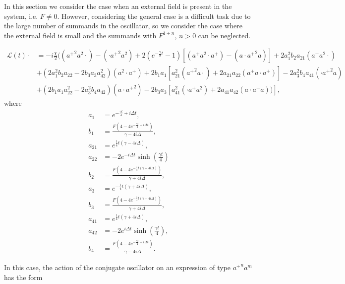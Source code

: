 \documentclass[12pt]{article}
\theoremstyle{definition}
\def\ga {\gamma}
\begin{document}
	In this section we consider the case when an external field is present in the system, i.e. $F \not= 0$. However, considering the general case is a difficult task due to the large number of summands in the oscillator, so we consider the case where the external field is small and the summands with $F^{1 + n}$, $n > 0$ can be neglected. 
	
	\begin{align}
		\label{eq:GenIntWithF}
		\mathcal{L}(t)\cdot &= -i\frac{\chi}{2}(({a^+}^2a^2\cdot) - (\cdot{a^+}^2a^2) + 2(e^{-\frac{\ga}{2}t} -1 ) [({a^+}a^2\cdot {a^+}) - (a\cdot{a^+}^2a) ] +2a_1^2b_2a_{21}({a^+}a^2\cdot) \nonumber\\
		&+ (2a_1^2b_2a_{22} - 2b_3a_3a_{42}^2)(a^2\cdot{a^+}) + 2b_1a_1 [a_{21}^2({a^+}^2a\cdot) + 2a_{21}a_{22}({a^+}a\cdot{a^+})] - 2a_3^2b_4a_{41}(\cdot{a^+}^2a) \\
		&+ (2b_1a_1a_{22}^2 - 2a_3^2b_4a_{42})(a\cdot{a^+}^2) - 2b_3a_3[a_{41}^2(\cdot{a^+}a^2) + 2 a_{41}a_{42}(a\cdot{a^+}a)) ]\nonumber,
	\end{align}
	where
	\begin{align*}
		a_1 &= e^{-\frac{\gamma  t}{4}+i \Delta  t}, \\
		b_1 &= \frac{F \left(4-4 e^{-\frac{\gamma  t}{4}+i \Delta  t}\right)}{\gamma -4 i \Delta },\\
		a_{21} &= e^{\frac{1}{4} t (\gamma -4 i \Delta )},\\
		a_{22} &= -2 e^{-i \Delta  t} \sinh \left(\frac{\gamma  t}{4}\right)\\
		b_2 &= \frac{F \left(4-4 e^{-\frac{1}{4} t (\gamma +4 i \Delta )}\right)}{\gamma +4 i \Delta },\\
		a_3 &= e^{-\frac{1}{4} t (\gamma +4 i \Delta )},\\
		b_3 &= \frac{F \left(4-4 e^{-\frac{1}{4} t (\gamma +4 i \Delta )}\right)}{\gamma +4 i \Delta },\\
		a_{41} &= e^{\frac{1}{4} t (\gamma +4 i \Delta )},\\
		a_{42} &= -2 e^{i \Delta  t} \sinh \left(\frac{\gamma  t}{4}\right),\\
		b_4 &= \frac{F \left(4-4 e^{-\frac{\gamma  t}{4}+i \Delta  t}\right)}{\gamma -4 i \Delta }.
	\end{align*}
	
	In this case, the action of the conjugate oscillator on an expression of type ${a^+}^na^m$ has the form
	
\end{document}
